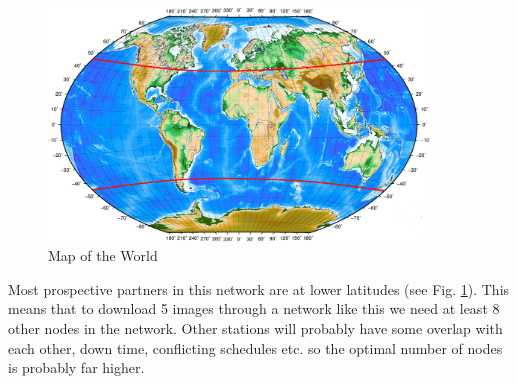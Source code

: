 \begin{figure}
  \begin{center}
    \includegraphics[width=0.9\textwidth]{Figures/verdenskart}
  \end{center}
  \caption[world]{Map of the World}
  \label{fig:world}
\end{figure}

Most prospective partners in this network are at lower latitudes (see Fig.  \ref{fig:world}). This means that to download 5 images through a network like this we need at least 8 other nodes in the network. Other stations will probably have some overlap with each other, down time, conflicting schedules etc. so the optimal number of nodes is probably far higher.



